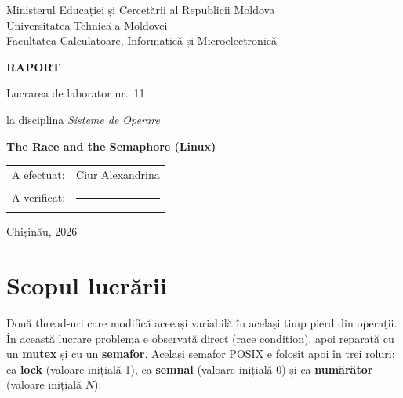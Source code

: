 \documentclass[11pt,a4paper]{article}
\begin{document}
\begin{titlepage}
\centering
{\large Ministerul Educației și Cercetării al Republicii Moldova\\
Universitatea Tehnică a Moldovei\\
Facultatea Calculatoare, Informatică și Microelectronică\par}
\vspace{5cm}
{\LARGE\bfseries RAPORT\par}
\vspace{0.6cm}
{\Large Lucrarea de laborator nr.~11\par}
\vspace{0.4cm}
{\large la disciplina \textit{Sisteme de Operare}\par}
\vspace{0.6cm}
{\Large\bfseries The Race and the Semaphore (Linux)\par}
\vfill
\begin{flushright}
\begin{tabular}{ll}
A efectuat: & Ciur Alexandrina \\
A verificat: & \rule{4.5cm}{0.4pt} \\
\end{tabular}
\end{flushright}
\vspace{2cm}
{\large Chișinău, 2026\par}
\end{titlepage}

\section*{Scopul lucrării}
Două thread-uri care modifică aceeași variabilă în același timp pierd din operații. În această lucrare problema
e observată direct (race condition), apoi reparată cu un \textbf{mutex} și cu un \textbf{semafor}. Același semafor POSIX
e folosit apoi în trei roluri: ca \textbf{lock} (valoare inițială 1), ca \textbf{semnal} (valoare inițială 0) și ca
\textbf{numărător} (valoare inițială $N$).
\end{document}
